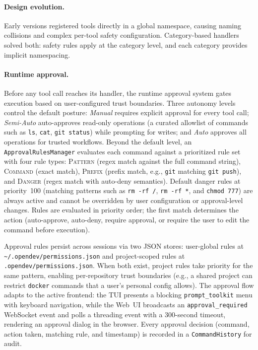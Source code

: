 \paragraph{Design evolution.} Early versions registered tools directly in a global namespace, causing naming collisions and complex per-tool safety configuration. Category-based handlers solved both: safety rules apply at the category level, and each category provides implicit namespacing.

\paragraph{Runtime approval.}
\label{sec:approval}
Before any tool call reaches its handler, the runtime approval system gates execution based on user-configured trust boundaries. Three autonomy levels control the default posture: \emph{Manual} requires explicit approval for every tool call; \emph{Semi-Auto} auto-approves read-only operations (a curated allowlist of commands such as \texttt{ls}, \texttt{cat}, \texttt{git status}) while prompting for writes; and \emph{Auto} approves all operations for trusted workflows. Beyond the default level, an \texttt{ApprovalRulesManager} evaluates each command against a prioritized rule set with four rule types: \textsc{Pattern} (regex match against the full command string), \textsc{Command} (exact match), \textsc{Prefix} (prefix match, e.g., \texttt{git} matching \texttt{git push}), and \textsc{Danger} (regex match with auto-deny semantics). Default danger rules at priority~100 (matching patterns such as \texttt{rm -rf /}, \texttt{rm -rf *}, and \texttt{chmod 777}) are always active and cannot be overridden by user configuration or approval-level changes. Rules are evaluated in priority order; the first match determines the action (auto-approve, auto-deny, require approval, or require the user to edit the command before execution).

Approval rules persist across sessions via two JSON stores: user-global rules at \texttt{\~{}/.opendev/permissions.json} and project-scoped rules at \texttt{.opendev/permissions.json}. When both exist, project rules take priority for the same pattern, enabling per-repository trust boundaries (e.g., a shared project can restrict \texttt{docker} commands that a user's personal config allows). The approval flow adapts to the active frontend: the TUI presents a blocking \texttt{prompt\_toolkit} menu with keyboard navigation, while the Web~UI broadcasts an \texttt{approval\_required} WebSocket event and polls a threading event with a 300-second timeout, rendering an approval dialog in the browser. Every approval decision (command, action taken, matching rule, and timestamp) is recorded in a \texttt{CommandHistory} for audit.

